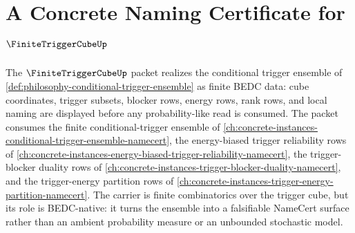 \chapter{A Concrete Naming Certificate for $\FiniteTriggerCubeUp$}
\label{ch:concrete-instances-finite-trigger-cube-namecert}

The $\FiniteTriggerCubeUp$ packet realizes the conditional trigger ensemble of \autoref{def:philosophy-conditional-trigger-ensemble} as finite BEDC data: cube coordinates, trigger subsets, blocker rows, energy rows, rank rows, and local naming are displayed before any probability-like read is consumed. The packet consumes the finite conditional-trigger ensemble of \autoref{ch:concrete-instances-conditional-trigger-ensemble-namecert}, the energy-biased trigger reliability rows of \autoref{ch:concrete-instances-energy-biased-trigger-reliability-namecert}, the trigger-blocker duality rows of \autoref{ch:concrete-instances-trigger-blocker-duality-namecert}, and the trigger-energy partition rows of \autoref{ch:concrete-instances-trigger-energy-partition-namecert}. The carrier is finite combinatorics over the trigger cube, but its role is BEDC-native: it turns the ensemble into a falsifiable NameCert surface rather than an ambient probability measure or an unbounded stochastic model.

